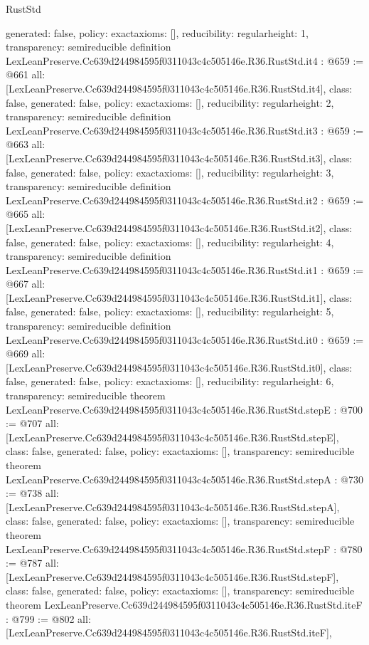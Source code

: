 \begin{lexlean}{RustStd}
\begin{coremodule}
{  generated: false,
  policy: exact{axioms: []},
  reducibility: regular{height: 1},
  transparency: semireducible
}
definition LexLeanPreserve.Cc639d244984595f0311043c4c505146e.R36.RustStd.it4 : @659 := @661 {
  all: [LexLeanPreserve.Cc639d244984595f0311043c4c505146e.R36.RustStd.it4],
  class: false,
  generated: false,
  policy: exact{axioms: []},
  reducibility: regular{height: 2},
  transparency: semireducible
}
definition LexLeanPreserve.Cc639d244984595f0311043c4c505146e.R36.RustStd.it3 : @659 := @663 {
  all: [LexLeanPreserve.Cc639d244984595f0311043c4c505146e.R36.RustStd.it3],
  class: false,
  generated: false,
  policy: exact{axioms: []},
  reducibility: regular{height: 3},
  transparency: semireducible
}
definition LexLeanPreserve.Cc639d244984595f0311043c4c505146e.R36.RustStd.it2 : @659 := @665 {
  all: [LexLeanPreserve.Cc639d244984595f0311043c4c505146e.R36.RustStd.it2],
  class: false,
  generated: false,
  policy: exact{axioms: []},
  reducibility: regular{height: 4},
  transparency: semireducible
}
definition LexLeanPreserve.Cc639d244984595f0311043c4c505146e.R36.RustStd.it1 : @659 := @667 {
  all: [LexLeanPreserve.Cc639d244984595f0311043c4c505146e.R36.RustStd.it1],
  class: false,
  generated: false,
  policy: exact{axioms: []},
  reducibility: regular{height: 5},
  transparency: semireducible
}
definition LexLeanPreserve.Cc639d244984595f0311043c4c505146e.R36.RustStd.it0 : @659 := @669 {
  all: [LexLeanPreserve.Cc639d244984595f0311043c4c505146e.R36.RustStd.it0],
  class: false,
  generated: false,
  policy: exact{axioms: []},
  reducibility: regular{height: 6},
  transparency: semireducible
}
theorem LexLeanPreserve.Cc639d244984595f0311043c4c505146e.R36.RustStd.stepE : @700 := @707 {
  all: [LexLeanPreserve.Cc639d244984595f0311043c4c505146e.R36.RustStd.stepE],
  class: false,
  generated: false,
  policy: exact{axioms: []},
  transparency: semireducible
}
theorem LexLeanPreserve.Cc639d244984595f0311043c4c505146e.R36.RustStd.stepA : @730 := @738 {
  all: [LexLeanPreserve.Cc639d244984595f0311043c4c505146e.R36.RustStd.stepA],
  class: false,
  generated: false,
  policy: exact{axioms: []},
  transparency: semireducible
}
theorem LexLeanPreserve.Cc639d244984595f0311043c4c505146e.R36.RustStd.stepF : @780 := @787 {
  all: [LexLeanPreserve.Cc639d244984595f0311043c4c505146e.R36.RustStd.stepF],
  class: false,
  generated: false,
  policy: exact{axioms: []},
  transparency: semireducible
}
theorem LexLeanPreserve.Cc639d244984595f0311043c4c505146e.R36.RustStd.iteF : @799 := @802 {
  all: [LexLeanPreserve.Cc639d244984595f0311043c4c505146e.R36.RustStd.iteF],
}
\end{coremodule}
\end{lexlean}
